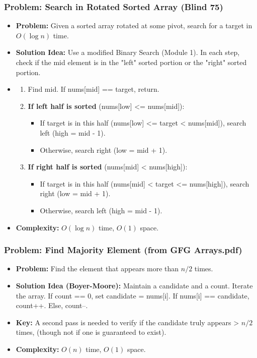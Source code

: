 \subsubsection{Problem: Search in Rotated Sorted Array (Blind 75)}
\begin{itemize}
\item \textbf{Problem:} Given a sorted array rotated at some pivot, search for a target in $O(\log n)$ time.
\item \textbf{Solution Idea:} Use a modified Binary Search (Module 1). In each step, check if the mid element is in the "left" sorted portion or the "right" sorted portion.
\item \begin{enumerate}
\item Find mid. If nums[mid] == target, return.
\item \textbf{If left half is sorted} (nums[low] <= nums[mid]):
\begin{itemize}
\item If target is in this half (nums[low] <= target < nums[mid]), search left (high = mid - 1).
\item Otherwise, search right (low = mid + 1).
\end{itemize}
\item \textbf{If right half is sorted} (nums[mid] < nums[high]):
\begin{itemize}
\item If target is in this half (nums[mid] < target <= nums[high]), search right (low = mid + 1).
\item Otherwise, search left (high = mid - 1).
\end{itemize}
\end{enumerate}
\item \textbf{Complexity:} $O(\log n)$ time, $O(1)$ space.
\end{itemize}

\subsubsection{Problem: Find Majority Element (from GFG Arrays.pdf)}
\begin{itemize}
\item \textbf{Problem:} Find the element that appears more than $n/2$ times.
\item \textbf{Solution Idea (Boyer-Moore):} Maintain a candidate and a count. Iterate the array. If count == 0, set candidate = nums[i]. If nums[i] == candidate, count++. Else, count--.
\item \textbf{Key:} A second pass is needed to verify if the candidate truly appears > $n/2$ times, (though not if one is guaranteed to exist).
\item \textbf{Complexity:} $O(n)$ time, $O(1)$ space.
\end{itemize}


